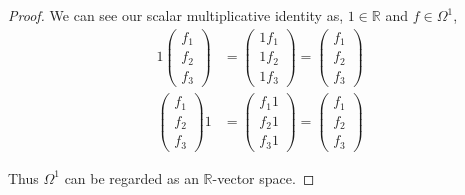 \documentclass[12pt]{article}
\newcommand      {\Rm}         {{\mathbb R}}
\begin{document}
\begin{itemize}
\begin{itemize}
\begin{proof}
                We can see our scalar multiplicative identity as, $1 \in \Rm$ and $f\in \Omega^1$,
                \begin{align*}
                    1\begin{pmatrix}f_1 \\ f_2 \\ f_3 \end{pmatrix} &= \begin{pmatrix}1f_1 \\ 1f_2 \\ 1f_3 \end{pmatrix} = \begin{pmatrix}f_1 \\ f_2 \\ f_3 \end{pmatrix} \\
                    \begin{pmatrix}f_1 \\ f_2 \\ f_3\end{pmatrix} 1 &= \begin{pmatrix}f_1 1 \\ f_2 1 \\ f_3 1 \end{pmatrix} = \begin{pmatrix}f_1 \\ f_2 \\ f_3\end{pmatrix}
                \end{align*}

                Thus $\Omega^1$ can be regarded as an $\Rm$-vector space.  



        \end{proof}


\end{itemize}
\end{itemize}
\end{document}

